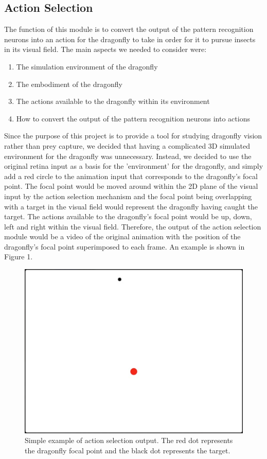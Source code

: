 \documentclass[a4paper,11pt]{article}
\begin{document}
\subsection{Action Selection}

The function of this module is to convert the output of the pattern recognition neurons into an action for the dragonfly to take in order for it to pursue insects in its visual field.
The main aspects we needed to consider were:
\begin{enumerate}
	\item The simulation environment of the dragonfly
	\item The embodiment of the dragonfly
	\item The actions available to the dragonfly within its environment
	\item How to convert the output of the pattern recognition neurons into actions
\end{enumerate}
Since the purpose of this project is to provide a tool for studying dragonfly vision rather than prey capture, we decided that having a complicated 3D simulated environment for the dragonfly was unnecessary. Instead, we decided to use the original retina input as a basis for the 'environment' for the dragonfly, and simply add a red circle to the animation input that corresponds to the dragonfly's focal point. The focal point would be moved around within the 2D plane of the visual input by the action selection mechanism and the focal point being overlapping with a target in the visual field would represent the dragonfly having caught the target. The actions available to the dragonfly's focal point would be up, down, left and right within the visual field. Therefore, the output of the action selection module would be a video of the original animation with the position of the dragonfly's focal point superimposed to each frame. An example is shown in Figure 1.

\begin{figure}[H]
\centering
\includegraphics[scale = 0.3]{as_example}
\caption{Simple example of action selection output. The red dot represents the dragonfly focal point and the black dot represents the target.}
\end{figure}
\end{document}
